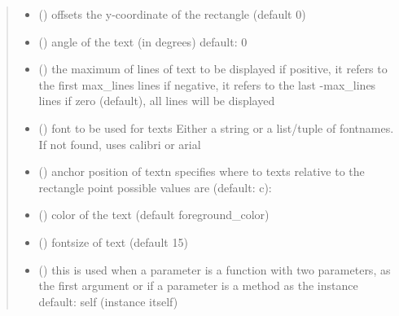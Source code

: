 \documentclass[letterpaper,10pt,english]{sphinxmanual}
\begin{document}
\begin{fulllineitems}
\begin{quote}
\begin{description}
\begin{itemize}
\item {} 
 () \textendash{} offsets the y-coordinate of the rectangle (default 0)

\item {} 
 () \textendash{} angle of the text (in degrees) 
default: 0

\item {} 
 () \textendash{} the maximum of lines of text to be displayed 
if positive, it refers to the first max\_lines lines 
if negative, it refers to the last -max\_lines lines 
if zero (default), all lines will be displayed

\item {} 
 () \textendash{} font to be used for texts 
Either a string or a list/tuple of fontnames.
If not found, uses calibri or arial

\item {} 
 () \textendash{} anchor position of text\textbar{}n\textbar{}
specifies where to texts relative to the rectangle
point 
possible values are (default: c): 

\item {} 
 () \textendash{} color of the text (default foreground\_color)

\item {} 
 () \textendash{} fontsize of text (default 15)

\item {} 
 () \textendash{} this is used when a parameter is a function with two parameters, as the first argument or
if a parameter is a method as the instance 
default: self (instance itself)


\end{itemize}
\end{description}
\end{quote}
\end{fulllineitems}
\end{document}
